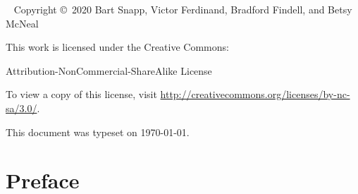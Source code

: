 \newpage

\begin{fullwidth}
~\vfill
\thispagestyle{empty}
\setlength{\parindent}{0pt}
\setlength{\parskip}{\baselineskip}
Copyright \copyright~2020 Bart Snapp, Victor Ferdinand, Bradford Findell, and Betsy McNeal

\vspace{.5cm}

\noindent
This work is licensed under the Creative Commons:
\begin{center}
Attribution-NonCommercial-ShareAlike License 
\end{center}
To view a copy of this license, visit \url{http://creativecommons.org/licenses/by-nc-sa/3.0/}.

\vspace{.5cm}
\noindent This document was typeset on \today.
\end{fullwidth}


\chapter*{Preface}


